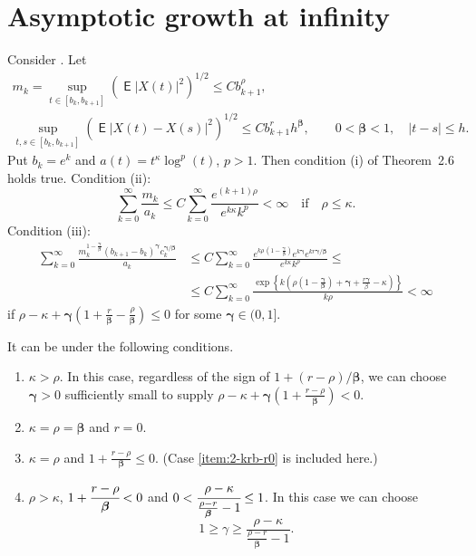 \documentclass{article}
\DeclareMathOperator{\ME}{\mathsf{E}}
\theoremstyle{plain}
\theoremstyle{remark}
\theoremstyle{definition}
\begin{document}
\section{Asymptotic growth at infinity}
Consider \cite[Theorem~2.6]{DKM}.
Let
\begin{gather*}
	m_k = \sup_{t\in[b_k,b_{k+1}]} (\ME |X(t)|^2)^{1/2}
	\le C b_{k+1}^\rho ,
	\\
	\sup_{t,s\in[b_k,b_{k+1}]} (\ME|X(t) - X(s)|^2)^{1/2}
	\le C b_{k+1}^r h^{\boldsymbol{\beta}},
	\qquad 0\mathbin{<}\boldsymbol{\beta}\mathbin{<}1,
	\quad |t-s|\mathbin{\le}h.
\end{gather*}
Put
$b_k = e^k$ and $a(t)=t^\kappa \log^p(t)$, $p\mathbin{>}1$.
Then condition (i) of Theorem~2.6 holds true.
Condition (ii):
\[
	\sum_{k=0}^\infty \frac{m_k}{a_k}
	\le
	C \sum_{k=0}^\infty \frac{e^{(k+1)\rho}}
	{e^{k \kappa} k^p}
	< \infty
	\quad \mbox{if} \quad
	\rho \mathbin{\le} \kappa.
\]
Condition (iii):
\begin{align*}
	\sum_{k=0}^\infty
	\frac{m_k^{1 - \frac{\boldsymbol{\gamma}}{\boldsymbol{\beta}}}
	(b_{k+1} - b_k)^{\boldsymbol\gamma}
	c_k^{\boldsymbol{\gamma}/\boldsymbol{\beta}}}
	{a_k}
	&\le
	C \sum_{k=0}^\infty
	\frac{e^{k \rho \, \left( 1
	- \frac{\boldsymbol{\gamma}}{\boldsymbol{\beta}} \right)}
	e^{k \boldsymbol{\gamma}} e^{k r \boldsymbol{\gamma} /
	\boldsymbol{\beta}}}
	{e^{k\kappa} k^\rho}
	\le \\ &\le
	C \sum_{k=0}^\infty
	\frac{\exp\left\{k \left( \rho \left(
	1 - \frac{\boldsymbol{\gamma}}{\boldsymbol{\beta}} \right)
	+ \boldsymbol{\gamma} + \frac{r \boldsymbol{\gamma}}
	{\beta} - \kappa \right) \right\}}
	{k \rho}
	< \infty
\end{align*}
if $\rho - \kappa + \boldsymbol{\gamma}
\left( 1 + \frac{r}{\boldsymbol{\beta}} - \frac{\rho}{\boldsymbol{\beta}}
\right) \le 0$
for some $\boldsymbol{\gamma}\in(0,1]$.

It can be under the following conditions.
\begin{enumerate}
	\def\theenumi{\arabic{enumi})}
	\def\labelenumi{\theenumi}
	\item $\kappa>\rho$.
		In this case, regardless of the sign of
		$1 + (r-\rho)/{\boldsymbol{\beta}}$,
		we can choose $\boldsymbol{\gamma}>0$
		sufficiently small to supply
		$\rho - \kappa + \boldsymbol{\gamma}
		\left( 1 + \frac{r-\rho}{\boldsymbol{\beta}}\right)
		< 0$.
	\item \label{item:2-krb-r0}
		$\kappa = \rho = \boldsymbol{\beta}$ and $r=0$.
	\item $\kappa = \rho$ and
		$1 + \frac{r-\rho}{\boldsymbol{\beta}} \le 0$.
		(Case \ref{item:2-krb-r0} is included here.)
	\item $\rho > \kappa$,
		$1 + \cfrac{r-\rho}{\boldsymbol{\beta}} < 0$ and
		$0 < \cfrac{\rho - \kappa}{\frac{\rho-r}{\boldsymbol{\beta}}
		- 1} \le 1$.
		In this case we can choose
		\[
			1 \ge \gamma \ge \frac{\rho-\kappa}
			{\frac{\rho-r}{\boldsymbol{\beta}} - 1} .
		\]
\end{enumerate}
\end{document}
